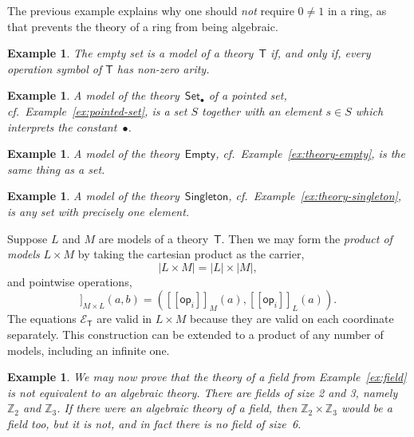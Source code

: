 \documentclass{amsart}
\newcommand{\ZZ}{\mathbb{Z}} %
\newcommand{\theory}[1]{\mathsf{#1}} %
\newcommand{\equations}[1]{\mathcal{E}_{\theory{#1}}} %
\newcommand{\op}[1]{\mathsf{op}_{#1}} %
\newcommand{\sem}[1]{[\![#1]\!]} %
\newtheorem{example}[definition]{Example}
\begin{document}
The previous example explains why one should \emph{not} require $0 \neq 1$ in a ring, as
that prevents the theory of a ring from being algebraic.

\begin{example}
  The empty set is a model of a theory~$\theory{T}$ if, and only if, every operation symbol
  of $\theory{T}$ has non-zero arity.
\end{example}

\begin{example}
  A model of the theory~$\theory{Set_\bullet}$ of a pointed set, cf.\
  Example~\ref{ex:pointed-set}, is a set $S$ together with an element $s \in S$ which
  interprets the constant~$\bullet$.
\end{example}

\begin{example}
  A model of the theory~$\theory{Empty}$, cf.\ Example~\ref{ex:theory-empty}, is the same
  thing as a set.
\end{example}

\begin{example}
  A model of the theory~$\theory{Singleton}$, cf.\ Example~\ref{ex:theory-singleton}, is
  any set with precisely one element.
\end{example}

Suppose $L$ and $M$ are models of a theory~$\theory{T}$. Then we may form the
\emph{product of models} $L \times M$ by taking the cartesian product as the carrier,
%
\begin{equation*}
  |L \times M| = |L| \times |M|,
\end{equation*}
%
and pointwise operations,
%
\begin{equation*}
  \sem{\op{i}}_{M \times L}(a, b) = (\sem{\op{i}}_M(a), \sem{\op{i}}_L(a)).
\end{equation*}
%
The equations $\equations{T}$ are valid in $L \times M$ because they are valid on each
coordinate separately. This construction can be extended to a product of any number of
models, including an infinite one.

\begin{example}
  We may now prove that the theory of a field from Example~\ref{ex:field} is not
  equivalent to an algebraic theory. There are fields of size 2 and 3, namely $\ZZ_2$ and
  $\ZZ_3$. If there were an algebraic theory of a field, then $\ZZ_2 \times \ZZ_3$ would
  be a field too, but it is not, and in fact there is no field of size~6.
\end{example}
\end{document}

